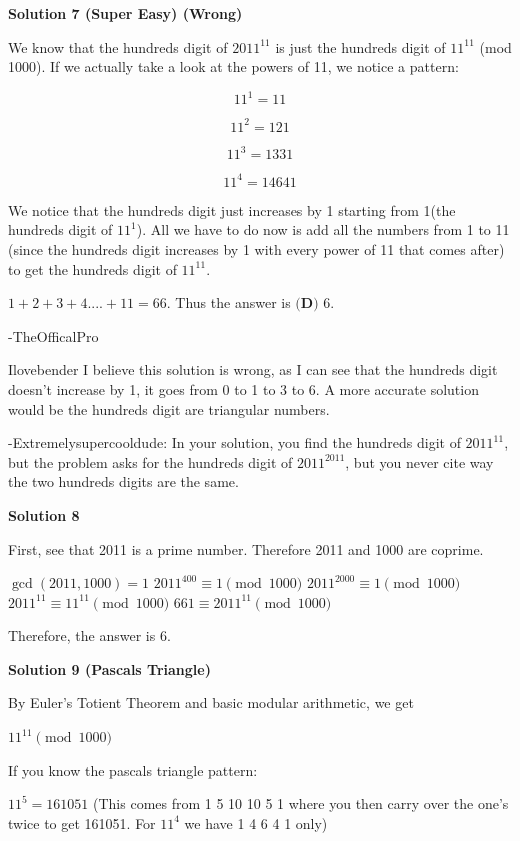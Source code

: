 \begin{enumerate}
 



\textbf{Solution 7 (Super Easy) (Wrong)}

We know that the hundreds digit of $2011^{11}$ is just the hundreds digit of $11^{11}$ (mod 1000). If we actually take a look at the powers of 11, we notice a pattern:

 
 \[11^{1} = 11\]

 \[11^{2} = 121\]

 \[11^{3} = 1331\]

 \[11^{4} = 14641\]

 
We notice that the hundreds digit just increases by 1 starting from 1(the hundreds digit of $11^{1}$). All we have to do now is add all the numbers from 1 to 11 (since the hundreds digit increases by 1 with every power of 11 that comes after) to get the hundreds digit of $11^{11}$.

 $1 + 2 + 3 + 4.... + 11 = 66$. Thus the answer is $\boxed{\textbf{(D) } 6}$.

 -TheOfficalPro

 Ilovebender I believe this solution is wrong, as I can see that the hundreds digit doesn't increase by 1, it goes from 0 to 1 to 3 to 6. A more accurate solution would be the hundreds digit are triangular numbers.

 -Extremelysupercooldude: In your solution, you find the hundreds digit of $2011^{11}$, but the problem asks for the hundreds digit of $2011^{2011}$, but you never cite way the two hundreds digits are the same. 

 



\textbf{Solution 8}

First, see that 2011 is a prime number. Therefore 2011 and 1000 are coprime.

 $\gcd{(2011, 1000)} = 1$
$2011^{400} \equiv 1 \pmod{1000 }$
$2011^{2000} \equiv 1 \pmod{1000}$
$2011^{11} \equiv 11^{11} \pmod{1000}$
$661 \equiv 2011^{11} \pmod {1000}$

 Therefore, the answer is 6.

 



\textbf{Solution 9 (Pascals Triangle)}

By Euler's Totient Theorem and basic modular arithmetic, we get

 $11^{11} \pmod{1000}$

 If you know the pascals triangle pattern:

 $11^5  = 161051$ (This comes from 1 5 10 10 5 1 where you then carry over the one's twice to get 161051. For $11^4$ we have 1 4 6 4 1 only)


\end{enumerate}
